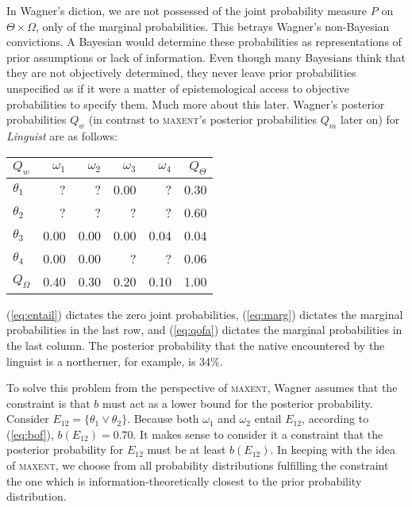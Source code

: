 \documentclass[11pt]{article}
\begin{document}
\medskip

In Wagner's diction, we are not possessed of the joint probability
measure $P$ on $\Theta\times\Omega$, only of the marginal
probabilities. This betrays Wagner's non-Bayesian convictions. A
Bayesian would determine these probabilities as representations of
prior assumptions or lack of information. Even though many Bayesians
think that they are not objectively determined, they never leave prior
probabilities unspecified as if it were a matter of epistemological
access to objective probabilities to specify them. Much more about
this later. Wagner's posterior probabilities $Q_{w}$ (in contrast to
\textsc{maxent}'s posterior probabilities $Q_{m}$ later on) for
\emph{Linguist} are as follows:

\medskip

\begin{tabular}{|l|r|r|r|r|r|}\hline
  $Q_{w}$ & $\omega_{1}$ & $\omega_{2}$ & $\omega_{3}$ & $\omega_{4}$ & $Q_{\Theta}$ \\ \hline
$\theta_{1}$ & ? & ? & 0.00 & ? & 0.30 \\ \hline
$\theta_{2}$ & ? & ? & ? & ? & 0.60 \\ \hline
$\theta_{3}$ & 0.00 & 0.00 & 0.00 & 0.04 & 0.04 \\ \hline
$\theta_{4}$ & 0.00 & 0.00 & ? & ? & 0.06 \\ \hline
$Q_{\Omega}$ & 0.40 & 0.30 & 0.20 & 0.10 & 1.00\\ \hline
\end{tabular}

\medskip

(\ref{eq:entail}) dictates the zero joint probabilities,
(\ref{eq:marg}) dictates the marginal probabilities in the last
row, and (\ref{eq:qofa}) dictates the marginal probabilities in
the last column. The posterior probability that the native
encountered by the linguist is a northerner, for example, is 34\%.

To solve this problem from the perspective of \textsc{maxent},
Wagner assumes that the constraint is that $b$ must act as a lower
bound for the posterior probability. Consider
$E_{12}=\{\theta_{1}\vee\theta_{2}\}$. Because both $\omega_{1}$
and $\omega_{2}$ entail $E_{12}$, according to (\ref{eq:bof}),
$b(E_{12})=0.70$. It makes sense to consider it a constraint that
the posterior probability for $E_{12}$ must be at least
$b(E_{12})$. In keeping with the idea of \textsc{maxent}, we
choose from all probability distributions fulfilling the
constraint the one which is information-theoretically closest to
the prior probability distribution. 
\end{document}
